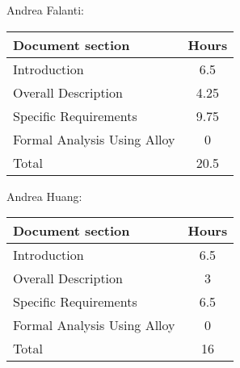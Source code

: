 Andrea Falanti:

\begin{tabular}{|l|c|}
    \hline
    Document section & Hours \\
    \hline
     Introduction & 6.5\\
     Overall Description & 4.25\\
     Specific Requirements & 9.75\\
     Formal Analysis Using Alloy & 0\\
     \hline
     Total & 20.5\\
     \hline
\end{tabular}
\vskip 0.3in

Andrea Huang:

\begin{tabular}{|l|c|}
    \hline
    Document section & Hours \\
    \hline
     Introduction &  6.5\\
     Overall Description & 3\\
     Specific Requirements & 6.5\\
     Formal Analysis Using Alloy & 0\\
     \hline
     Total & 16\\
     \hline
\end{tabular}